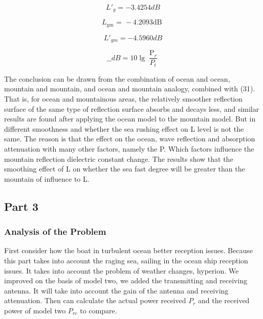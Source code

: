 \documentclass{mcmthesis}
\begin{document}
\begin{equation} \label{33}
L{'_g} =  - 3.4254dB
\end{equation}

\begin{equation} \label{34}
{L_{{\text{gm}}}}{\text{ = }} - 4.2093{\text{dB  }}
\end{equation}

\begin{equation} \label{35}
L{'_{gm}} =  - 4.5960dB
\end{equation}

\begin{equation} \label{36}
\_\_dB = 10\lg \frac{{{\operatorname{P} _r}}}{{{P_t}}}
\end{equation}


The conclusion can be drawn from the combination of ocean and ocean, mountain and mountain, and ocean and mountain analogy, combined with (31). That is, for ocean and mountainous areas, the relatively smoother reflection surface of the same type of reflection surface absorbs and decays less, and similar results are found after applying the ocean model to the mountain model. But in different smoothness and whether the sea rushing effect on L level is not the same. The reason is that the effect on the ocean, wave reflection and absorption attenuation with many other factors, namely the P. Which factors influence the mountain reflection dielectric constant change. The results show that the smoothing effect of L on whether the sea fast degree will be greater than the mountain of influence to L.


\subsection{Part 3}

\subsubsection{Analysis of the Problem}
First consider how the boat in turbulent ocean better reception issues. Because this part takes into account the raging sea, sailing in the ocean ship reception issues. It takes into account the problem of weather changes, hyperion. We improved on the basis of model two, we added the transmitting and receiving antenna. It will take into account the gain of the antenna and receiving attenuation. Then can calculate the actual power received $P_r$ and the received power of model two $P_{re}$ to compare.
\end{document}
